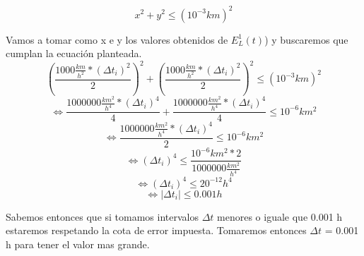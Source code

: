 \documentclass[a4paper,10pt]{article}
\begin{document}
\begin{equation}
	x^2 + y^2 \leq (10^{-3} km)^2
\end{equation}
\par Vamos a tomar como x e y los valores obtenidos de $E_L^1(t)$) y buscaremos que cumplan la ecuación planteada.
\begin{equation}
	(\frac{1000 \frac{km}{h^2} * (\Delta t_i)^2}{2})^2 + (\frac{1000 \frac{km}{h^2} * (\Delta t_i)^2}{2})^2 \leq (10^{-3} km)^2
\end{equation}
\begin{equation}
	\Leftrightarrow \frac{1000000 \frac{km^2}{h^4} * (\Delta t_i)^4}{4} + \frac{1000000 \frac{km^2}{h^4} * (\Delta t_i)^4}{4} \leq 10^{-6} km^2
\end{equation}
\begin{equation}
	\Leftrightarrow \frac{1000000 \frac{km^2}{h^4} * (\Delta t_i)^4}{2} \leq 10^{-6} km^2
\end{equation}
\begin{equation}
	\Leftrightarrow (\Delta t_i)^4 \leq \frac{10^{-6} km^2 * 2}{1000000 \frac{km^2}{h^4}}
\end{equation}
\begin{equation}
	\Leftrightarrow (\Delta t_i)^4 \leq 20^{-12} h^4
\end{equation}
\begin{equation}
	\Leftrightarrow | \Delta t_i | \leq 0.001 h
\end{equation}
\par Sabemos entonces que si tomamos intervalos $\Delta t$ menores o iguale que 0.001 h estaremos respetando la cota de error impuesta. Tomaremos entonces $\Delta t$ = 0.001 h para tener el valor mas grande.
\end{document}
